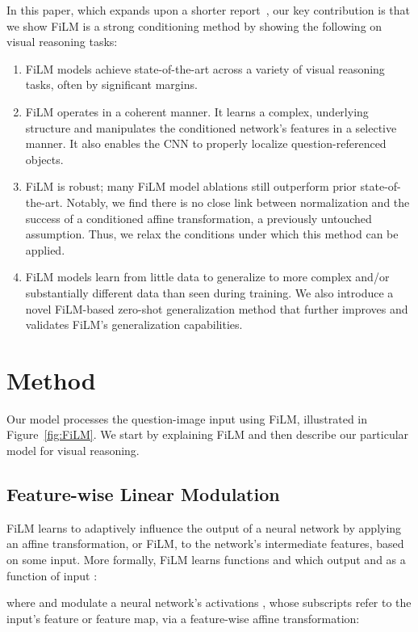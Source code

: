 \documentclass[letterpaper]{article} \usepackage{aaai18}  \usepackage{times}  \usepackage{helvet}  \usepackage{courier}  \usepackage{url}  \usepackage{graphicx}  \frenchspacing  \setlength{\pdfpagewidth}{8.5in}  \setlength{\pdfpageheight}{11in}
\begin{document}
    In this paper, which expands upon a shorter report~\cite{LVRWSP}, our key contribution is that we show FiLM is a strong conditioning method by showing the following on visual reasoning tasks:
    \begin{enumerate}
    	\item FiLM models achieve state-of-the-art across a variety of visual reasoning tasks, often by significant margins.
        \item FiLM operates in a coherent manner. It learns a complex, underlying structure and manipulates the conditioned network's features in a selective manner. It also enables the CNN to properly localize question-referenced objects.
        \item FiLM is robust; many FiLM model ablations still outperform prior state-of-the-art. Notably, we find there is no close link between normalization and the success of a conditioned affine transformation, a previously untouched assumption. Thus, we relax the conditions under which this method can be applied.
        \item FiLM models learn from little data to generalize to more complex and/or substantially different data than seen during training. We also introduce a novel FiLM-based zero-shot generalization method that further improves and validates FiLM's generalization capabilities.
    \end{enumerate}

\section{Method} \label{method}

    Our model processes the question-image input using FiLM, illustrated in Figure~\ref{fig:FiLM}. We start by explaining FiLM and then describe our particular model for visual reasoning.

	\subsection{Feature-wise Linear Modulation}
		\label{FiLM}
FiLM learns to adaptively influence the output of a neural network by applying an affine transformation, or FiLM, to the network's intermediate features, based on some input. More formally, FiLM learns
functions  and  which output  and  as a function of input :
  
where  and  modulate a neural network's activations , whose subscripts refer to the  input's  feature or feature map, via a feature-wise affine transformation:
  
\end{document}
